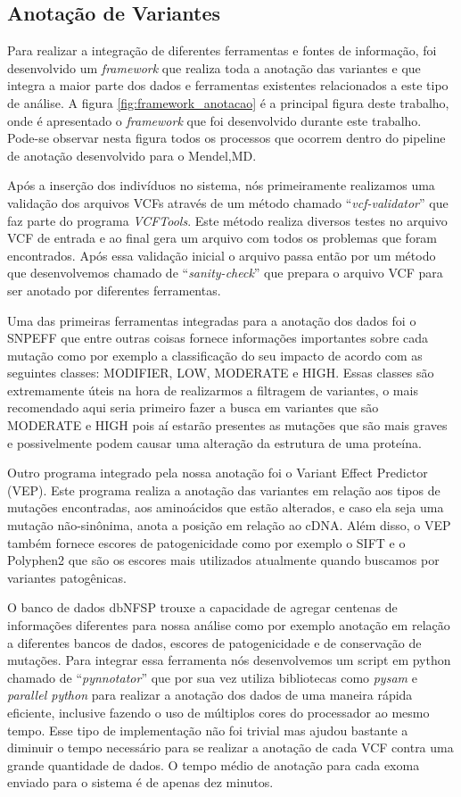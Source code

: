 \subsection{Anotação de Variantes}

Para realizar a integração de diferentes ferramentas e fontes de informação, foi desenvolvido um \textit{framework} que realiza toda a anotação das variantes e que integra a maior parte dos dados e ferramentas existentes relacionados a este tipo de análise. A figura \ref{fig:framework_anotacao} é a principal figura deste trabalho, onde é apresentado o \textit{framework} que foi desenvolvido durante este trabalho. Pode-se observar nesta figura todos os processos que ocorrem dentro do pipeline de anotação desenvolvido para o Mendel,MD.

Após a inserção dos indivíduos no sistema, nós primeiramente realizamos uma validação dos arquivos VCFs através de um método chamado ``\textit{vcf-validator}'' que faz parte do programa \textit{VCFTools}. Este método realiza diversos testes no arquivo VCF de entrada e ao final gera um arquivo com todos os problemas que foram encontrados. Após essa validação inicial o arquivo passa então por um método que desenvolvemos chamado de ``\textit{sanity-check}'' que prepara o arquivo VCF para ser anotado por diferentes ferramentas.

Uma das primeiras ferramentas integradas para a anotação dos dados foi o SNPEFF que entre outras coisas fornece informações importantes sobre cada mutação como por exemplo a classificação do seu impacto de acordo com as seguintes classes: MODIFIER, LOW, MODERATE e HIGH. Essas classes são extremamente úteis na hora de realizarmos a filtragem de variantes, o mais recomendado aqui seria primeiro fazer a busca em variantes que são MODERATE e HIGH pois aí estarão presentes as mutações que são mais graves e possivelmente podem causar uma alteração da estrutura de uma proteína.

Outro programa integrado pela nossa anotação foi o Variant Effect Predictor (VEP). Este programa realiza a anotação das variantes em relação aos tipos de mutações encontradas, aos aminoácidos que estão alterados, e caso ela seja uma mutação não-sinônima, anota a posição em relação ao cDNA. Além disso, o VEP também fornece escores de patogenicidade como por exemplo o SIFT e o Polyphen2 que são os escores mais utilizados atualmente quando buscamos por variantes patogênicas.

O banco de dados dbNFSP trouxe a capacidade de agregar centenas de informações diferentes para nossa análise como por exemplo anotação em relação a diferentes bancos de dados, escores de patogenicidade e de conservação de mutações. Para integrar essa ferramenta nós desenvolvemos um script em python chamado de ``\textit{pynnotator}'' que por sua vez utiliza bibliotecas como \textit{pysam} e \textit{parallel python} para realizar a anotação dos dados de uma maneira rápida eficiente, inclusive fazendo o uso de  múltiplos cores do processador ao mesmo tempo. Esse tipo de implementação não foi trivial mas ajudou bastante a diminuir o tempo necessário para se realizar a anotação de cada VCF contra uma grande quantidade de dados. O tempo médio de anotação para cada exoma enviado para o sistema é de apenas dez minutos.

